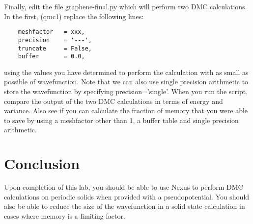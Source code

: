 Finally, edit the file graphene-final.py which will perform two DMC calculations.  In the first, (qmc1) replace the following lines:
\begin{lstlisting}
    meshfactor   = xxx,
    precision    = '---',
    truncate     = False,
    buffer       = 0.0,
\end{lstlisting}
using the values you have determined to perform the calculation with as small as possible of wavefunction.  Note that we can also use single precision arithmetic to store the wavefunction by specifying precision='single'.  When you run the script, compare the output of the two DMC calculations in terms of energy and variance.  Also see if you can calculate the fraction of memory that you were able to save by using a meshfactor other than 1, a buffer table and single precision arithmetic.

\section{Conclusion}
Upon completion of this lab, you should be able to use Nexus to perform DMC calculations on periodic solids when provided with a pseudopotential.  You should also be able to reduce the size of the wavefunction in a solid state calculation in cases where memory is a limiting factor.

